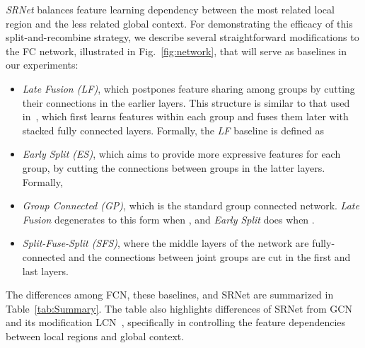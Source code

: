 \documentclass[runningheads]{llncs}
\begin{document}
\emph{SRNet} balances feature learning dependency between the most related local region and the less related global context. For demonstrating the efficacy of this split-and-recombine strategy, we describe several straightforward modifications to the FC network, illustrated in Fig.~\ref{fig:network}, that will serve as baselines in our experiments:
\begin{itemize}
\item \emph{Late Fusion (LF)}, which postpones feature sharing among groups by cutting their connections in the earlier layers. This structure is similar to that used in~\cite{park20183d}, which first learns features within each group and fuses them later with stacked fully connected layers. Formally, the \emph{LF} baseline is defined as


\item \emph{Early Split (ES)}, which aims to provide more expressive features for each group, by cutting the connections between groups in the latter layers. Formally,


\item \emph{Group Connected (GP)}, which is the standard group connected network. \emph{Late Fusion} degenerates to this form when , and \emph{Early Split} does when .

\item \emph{Split-Fuse-Split (SFS)}, where the middle  layers of the network are fully-connected and the connections between joint groups are cut in the first and last layers.
\end{itemize}

The differences among FCN, these baselines, and SRNet are summarized in Table~\ref{tab:Summary}. The table also highlights differences of SRNet from GCN~\cite{zhao2019semantic} and its modification LCN~\cite{ci2019optimizing}, specifically in controlling the feature dependencies between local regions and global context.
\end{document}
